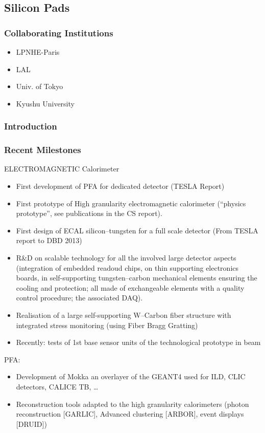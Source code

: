 \subsection{Silicon Pads}
\subsubsection{Collaborating Institutions}
\begin{itemize}
	\item LPNHE-Paris
	\item LAL
	\item Univ. of Tokyo
	\item Kyushu University
\end{itemize}
\subsubsection{Introduction}
\subsubsection{Recent Milestones}
ELECTROMAGNETIC Calorimeter
\begin{itemize}
	\item First development of PFA for dedicated detector (TESLA Report)
	\item First prototype of High granularity electromagnetic calorimeter (``physics prototype'', see publications in the CS report).
	\item First design of ECAL silicon--tungsten for a full scale detector (From TESLA report to DBD 2013)
	\item R\&D on scalable technology for all the involved large detector aspects (integration of embedded readoud chips, on thin supporting electronics boards, in self-supporting tungsten--carbon mechanical elements ensuring the cooling and protection; all made of exchangeable elements with a quality control procedure; the associated DAQ).
	\item Realisation of a large self-supporting W--Carbon fiber structure with integrated stress monitoring (using Fiber Bragg Gratting) 
	\item Recently: tests of 1st base sensor units of the technological prototype in beam
\end{itemize}
PFA:
\begin{itemize}
	\item Development of Mokka an overlayer of the GEANT4 used for ILD, CLIC detectors, CALICE TB, \ldots
	\item Reconstruction tools adapted to the high granularity calorimeters (photon reconstruction [GARLIC], Advanced clustering [ARBOR], event displays [DRUID])
\end{itemize}

